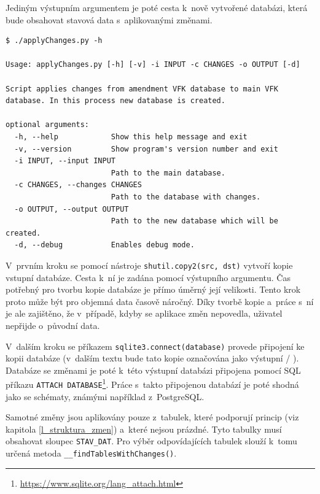 \documentclass[a4paper,12pt,oneside]{book}
\begin{document}
Jediným výstupním argumentem je poté cesta k~nově vytvořené databázi, která bude obsahovat stavová data s~aplikovanými změnami.

\begin{lstlisting}[caption={Nápověda ke konzolové aplikaci pro implementaci změn}, 
		    label=l_apply_changes_ukazka]
$ ./applyChanges.py -h

Usage: applyChanges.py [-h] [-v] -i INPUT -c CHANGES -o OUTPUT [-d]

Script applies changes from amendment VFK database to main VFK database. In this process new database is created.

optional arguments:
  -h, --help            Show this help message and exit
  -v, --version         Show program's version number and exit
  -i INPUT, --input INPUT
                        Path to the main database.
  -c CHANGES, --changes CHANGES
                        Path to the database with changes.
  -o OUTPUT, --output OUTPUT
                        Path to the new database which will be created.
  -d, --debug           Enables debug mode.

\end{lstlisting}

V~prvním kroku se pomocí nástroje \texttt{shutil.copy2(src, dst)}
vytvoří kopie vstupní databáze. Cesta k~ní je zadána pomocí výstupního
argumentu. Čas potřebný pro tvorbu kopie databáze je přímo úměrný její
velikosti. Tento krok proto může být pro objemná data časově
náročný. Díky tvorbě kopie a~práce s~ní je ale zajištěno, že
v~případě, kdyby se aplikace změn nepovedla, uživatel nepřijde
o~původní data.

V~dalším kroku se příkazem \texttt{sqlite3.connect(database)} provede
připojení ke kopii databáze (v~dalším textu bude tato kopie označována
jako výstupní / ). Databáze se změnami je poté k~této výstupní
databázi připojena pomocí SQL příkazu \texttt{ATTACH
  DATABASE}\footnote{\url{https://www.sqlite.org/lang\_attach.html}}. Práce
s~takto připojenou databází je poté shodná jako se schématy, známými
například z~PostgreSQL.

Samotné změny jsou aplikovány pouze z~tabulek, které podporují princip
 (viz kapitola \ref{l_struktura_zmen}) a~které nejsou
prázdné. Tyto tabulky musí obsahovat sloupec \texttt{STAV\_DAT}. Pro
výběr odpovídajících tabulek slouží k~tomu určená metoda
\texttt{\_\_findTablesWithChanges()}.
\end{document}
